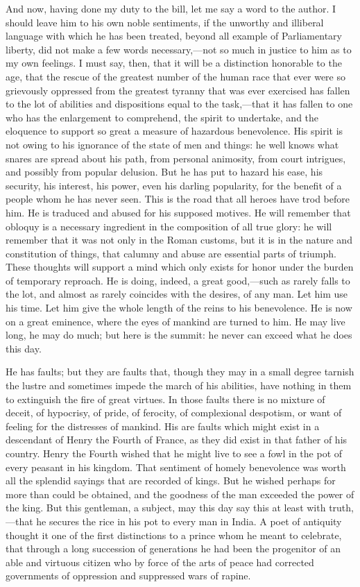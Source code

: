 And now, having done my duty to the bill, let me say a word to the author. I should leave him to his own noble sentiments, if the unworthy and illiberal language with which he has been treated, beyond all example of Parliamentary liberty, did not make a few words necessary,—not so much in justice to him as to my own feelings. I must say, then, that it will be a distinction honorable to the age, that the rescue of the greatest number of the human race that ever were so grievously oppressed from the greatest tyranny that was ever exercised has fallen to the lot of abilities and dispositions equal to the task,—that it has fallen to one who has the enlargement to comprehend, the spirit to undertake, and the eloquence to support so great a measure of hazardous benevolence. His spirit is not owing to his ignorance of the state of men and things: he well knows what snares are spread about his path, from personal animosity, from court intrigues, and possibly from popular delusion. But he has put to hazard his ease, his security, his interest, his power, even his darling popularity, for the benefit of a people whom he has never seen. This is the road that all heroes have trod before him. He is traduced and abused for his supposed motives. He will remember that obloquy is a necessary ingredient in the composition of all true glory: he will remember that it was not only in the Roman customs, but it is in the nature and constitution of things, that calumny and abuse are essential parts of triumph. These thoughts will support a mind which only exists for honor under the burden of temporary reproach. He is doing, indeed, a great good,—such as rarely falls to the lot, and almost as rarely coincides with the desires, of any man. Let him use his time. Let him give the whole length of the reins to his benevolence. He is now on a great eminence, where the eyes of mankind are turned to him. He may live long, he may do much; but here is the summit: he never can exceed what he does this day.

He has faults; but they are faults that, though they may in a small degree tarnish the lustre and sometimes impede the march of his abilities, have nothing in them to extinguish the fire of great virtues. In those faults there is no mixture of deceit, of hypocrisy, of pride, of ferocity, of complexional despotism, or want of feeling for the distresses of mankind. His are faults which might exist in a descendant of Henry the Fourth of France, as they did exist in that father of his country. Henry the Fourth wished that he might live to see a fowl in the pot of every peasant in his kingdom. That sentiment of homely benevolence was worth all the splendid sayings that are recorded of kings. But he wished perhaps for more than could be obtained, and the goodness of the man exceeded the power of the king. But this gentleman, a subject, may this day say this at least with truth,—that he secures the rice in his pot to every man in India. A poet of antiquity thought it one of the first distinctions to a prince whom he meant to celebrate, that through a long succession of generations he had been the progenitor of an able and virtuous citizen who by force of the arts of peace had corrected governments of oppression and suppressed wars of rapine.

